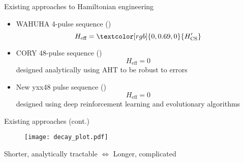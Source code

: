 \documentclass{beamer}
\begin{document}
\begin{frame}{Existing approaches to Hamiltonian engineering}


\begin{itemize}
    \item WAHUHA 4-pulse sequence (\cite{PhysRevLett.20.180})
    \[H_\text{eff} = \textcolor[rgb]{0,0.69,0}{H_{\text{CS}}'}\]
    
    \item CORY 48-pulse sequence (\cite{CORY1990205})
    \[H_\text{eff} = 0\]
    designed analytically using AHT to be robust to errors
    
    
    \item New yxx48 pulse sequence (\cite{peng2021deep})
    \[H_\text{eff} = 0\]
    designed using deep reinforcement learning and evolutionary algorithms
\end{itemize}


\end{frame}



\begin{frame}{Existing approaches (cont.)}

\begin{figure}
\centering
\texttt{[image: decay\_plot.pdf]}
\end{figure}

Shorter, analytically tractable $\iff$ Longer, complicated



\end{frame}
\end{document}
